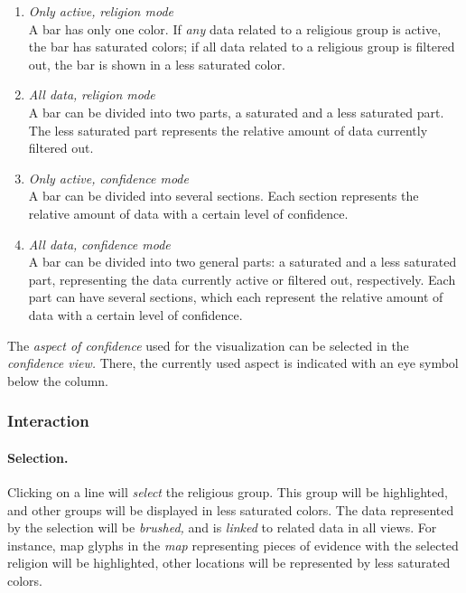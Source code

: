 \begin{enumerate}
  \item \emph{Only active,} \emph{religion mode} \\
    A bar has only one color.
    If \emph{any} data related to a religious group is active, the bar has saturated colors;
    if all data related to a religious group is filtered out, the bar is shown in a less saturated color.

  \item \emph{All data,} \emph{religion mode} \\
    A bar can be divided into two parts, a saturated and a less saturated part.
    The less saturated part represents the relative amount of data currently filtered out.

  \item \emph{Only active,} \emph{confidence mode} \\
    A bar can be divided into several sections.
    Each section represents the relative amount of data with a certain level of confidence.

  \item \emph{All data,} \emph{confidence mode} \\
    A bar can be divided into two general parts:
    a saturated and a less saturated part, representing the data currently active or filtered out, respectively.
    Each part can have several sections, which each represent the relative amount of data with a certain level of confidence.
\end{enumerate}

The \emph{aspect of confidence} used for the visualization can be selected in the \emph{confidence view.}
There, the currently used aspect is indicated with an eye symbol below the column.


\subsubsection{Interaction}

\paragraph{Selection.}
Clicking on a line will \emph{select} the religious group.
This group will be highlighted, and other groups will be displayed in less saturated colors.
The data represented by the selection will be \emph{brushed,} and is \emph{linked} to related data in all views.
For instance, map glyphs in the \emph{map} representing pieces of evidence with the selected religion will be highlighted, other locations will be represented by less saturated colors.


